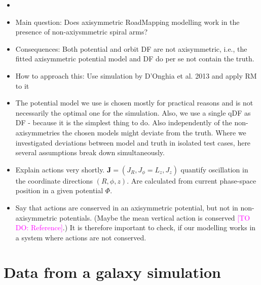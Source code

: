 \documentclass[iop,revtex4,numberedappendix,appendixfloats]{emulateapj}
\newcommand{\vect}[1]{\boldsymbol{#1}}
\newcommand{\Wilma}[1]{\textcolor{Magenta}{#1}}
\begin{document}
\begin{itemize}
\item 
\item Main question: Does axisymmetric RoadMapping modelling work in the presence of non-axiysmmetric spiral arms?
\item Consequences: Both potential and orbit DF are not axisymmetric, i.e., the fitted axisymmetric potential model and DF do per se not contain the truth.
\item How to approach this: Use simulation by D'Onghia et al. 2013 and apply RM to it
\item The potential model we use is chosen mostly for practical reasons and is not necessarily the optimal one for the simulation. Also, we use a single qDF as DF - because it is the simplest thing to do. Also independently of the non-axisymmetries the chosen models might deviate from the truth. Where we investigated deviations between model and truth in isolated test cases, here several assumptions break down simultaneously.
\item Explain actions very shortly. $\vect{J}=(J_R,J_\phi=L_z,J_z)$ quantify oscillation in the coordinate directions $(R,\phi,z)$. Are calculated from current phase-space position in a given potential $\Phi$.
\item Say that actions are conserved in an axisymmetric potential, but not in non-axisymmetric potentials. (Maybe the mean vertical action is conserved \Wilma{[TO DO: Reference]}.) It is therefore important to check, if our modelling works in a system where actions are not conserved.
\end{itemize}

\section{Data from a galaxy simulation} \label{sec:simulation}
\end{document}
